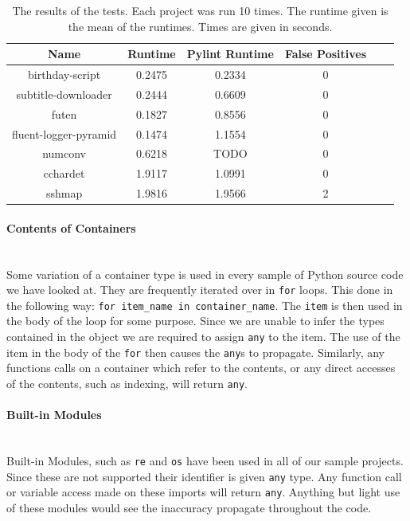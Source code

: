 \documentclass[12pt, titlepage]{article}
\begin{document}
    	\begin{table}
	\centering
    \begin{tabular}{ | c | c | c | c | c | c |}
    \hline
    \textbf{Name} & \textbf{Runtime} & \textbf{Pylint Runtime} & \textbf{False Positives} \\ \hline
    birthday-script & 0.2475 & 0.2334 & 0 \\ \hline
    subtitle-downloader & 0.2444 & 0.6609 & 0 \\ \hline
    futen & 0.1827 & 0.8556 & 0 \\ \hline
    fluent-logger-pyramid & 0.1474 & 1.1554 & 0 \\ \hline
    numconv & 0.6218 & TODO & 0 \\ \hline
    cchardet &  1.9117 & 1.0991 & 0  \\ \hline
    sshmap & 1.9816 & 1.9566 & 2 \\ \hline
    \end{tabular}
    \caption{The results of the tests. Each project was run 10 times. The runtime given is the mean of the runtimes. Times are given in seconds.}
	\label{table:toolResults}
    \end{table}

\paragraph*{Contents of Containers}\mbox{}\\
Some variation of a container type is used in every sample of Python source code we have looked at. They are frequently iterated over in \texttt{for} loops. This done in the following way: \texttt{for item\_name in container\_name}. The \texttt{item} is then used in the body of the loop for some purpose. Since we are unable to infer the types contained in the object we are required to assign \texttt{any} to the item. The use of the item in the body of the \texttt{for} then causes the \texttt{any}s to propagate. Similarly, any functions calls on a container which refer to the contents, or any direct accesses of the contents, such as indexing, will return \texttt{any}.

\paragraph*{Built-in Modules}\mbox{}\\
Built-in Modules, such as \texttt{re} and \texttt{os} have been used in all of our sample projects. Since these are not supported their identifier is given \texttt{any} type. Any function call or variable access made on these imports will return \texttt{any}. Anything but light use of these modules would see the inaccuracy propagate throughout the code. \\
\end{document}
